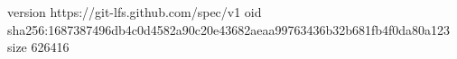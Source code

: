version https://git-lfs.github.com/spec/v1
oid sha256:1687387496db4c0d4582a90c20e43682aeaa99763436b32b681fb4f0da80a123
size 626416
